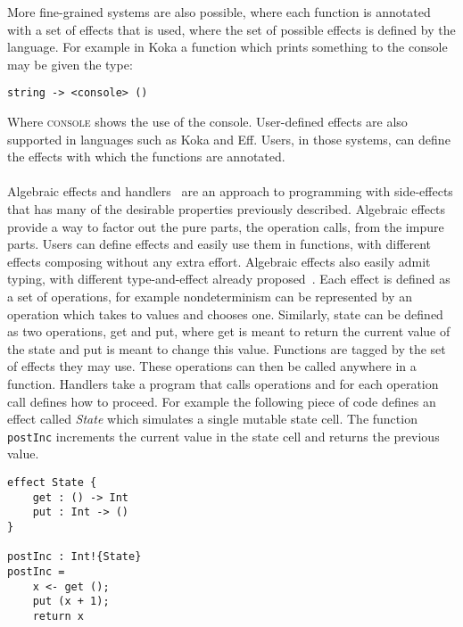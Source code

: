 More fine-grained systems are also possible, where each function is annotated with a set of effects that is used, where the set of possible effects is defined by the language.
For example in Koka a function which prints something to the console may be given the type:
\begin{verbatim}
string -> <console> () 
\end{verbatim}
Where \textsc{console} shows the use of the console.
User-defined effects are also supported in languages such as Koka and Eff.
Users, in those systems, can define the effects with which the functions are annotated.
\\\\
Algebraic effects and handlers~\cite{algeff} are an approach to programming with side-effects that has many of the desirable properties previously described.
Algebraic effects provide a way to factor out the pure parts, the operation calls, from the impure parts.
Users can define effects and easily use them in functions, with different effects composing without any extra effort.
Algebraic effects also easily admit typing, with different type-and-effect already proposed~\cite{eff2,koka,links}.
Each effect is defined as a set of operations, for example nondeterminism can be represented by an operation which takes to values and chooses one.
Similarly, state can be defined as two operations, get and put, where get is meant to return the current value of the state and put is meant to change this value.
Functions are tagged by the set of effects they may use.
These operations can then be called anywhere in a function.
Handlers take a program that calls operations and for each operation call defines how to proceed.
For example the following piece of code defines an effect called \textit{State} which simulates a single mutable state cell.
The function \texttt{postInc} increments the current value in the state cell and returns the previous value.
\begin{verbatim}
effect State {
	get : () -> Int
	put : Int -> ()
}

postInc : Int!{State}
postInc =
	x <- get ();
	put (x + 1);
	return x
\end{verbatim}

